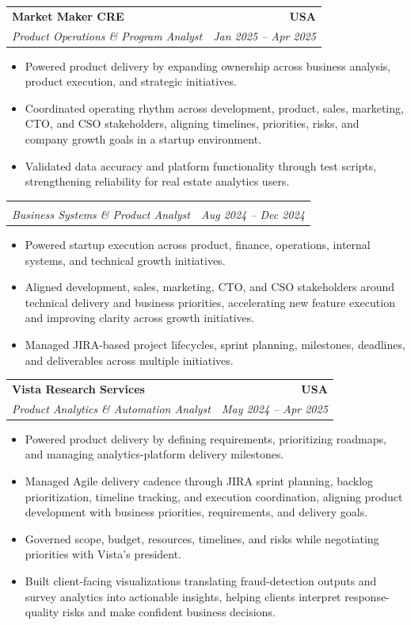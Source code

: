 \documentclass[letterpaper,10pt]{article}
\makeatletter
\newcommand{\resumeItem}[1]{\item \small{#1}}
\newcommand{\resumeSubheading}[4]{
  \vspace{1pt}\item
    \begin{tabular*}{1.0\textwidth}[t]{l@{\extracolsep{\fill}}r}
      \textbf{#1} & \textbf{\small #2} \\
      \textit{\small #3} & \textit{\small #4} \\
    \end{tabular*}\vspace{-6pt}
}
\newcommand{\resumeItemListStart}{\begin{itemize}[leftmargin=0.15in, itemsep=1pt, topsep=3pt]}
\newcommand{\resumeItemListEnd}{\end{itemize}\vspace{-2pt}}
\makeatother
\begin{document}
\vspace{-2pt}

\resumeSubheading
{Market Maker CRE}{USA}
{Product Operations \& Program Analyst}{Jan 2025 -- Apr 2025}
\resumeItemListStart
\resumeItem{Powered product delivery by expanding ownership across business analysis, product execution, and strategic initiatives.}
\resumeItem{Coordinated operating rhythm across development, product, sales, marketing, CTO, and CSO stakeholders, aligning timelines, priorities, risks, and company growth goals in a startup environment.}
\resumeItem{Validated data accuracy and platform functionality through test scripts, strengthening reliability for real estate analytics users.}
\resumeItemListEnd

\vspace{-12pt}

\resumeSubheading
{}{}
{Business Systems \& Product Analyst}{Aug 2024 -- Dec 2024}
\resumeItemListStart
\resumeItem{Powered startup execution across product, finance, operations, internal systems, and technical growth initiatives.}
\resumeItem{Aligned development, sales, marketing, CTO, and CSO stakeholders around technical delivery and business priorities, accelerating new feature execution and improving clarity across growth initiatives.}
\resumeItem{Managed JIRA-based project lifecycles, sprint planning, milestones, deadlines, and deliverables across multiple initiatives.}
\resumeItemListEnd

\vspace{-2pt}

\resumeSubheading
{Vista Research Services}{USA}
{Product Analytics \& Automation Analyst}{May 2024 -- Apr 2025}
\resumeItemListStart
\resumeItem{Powered product delivery by defining requirements, prioritizing roadmaps, and managing analytics-platform delivery milestones.}
\resumeItem{Managed Agile delivery cadence through JIRA sprint planning, backlog prioritization, timeline tracking, and execution coordination, aligning product development with business priorities, requirements, and delivery goals.}
\resumeItem{Governed scope, budget, resources, timelines, and risks while negotiating priorities with Vista's president.}
\resumeItem{Built client-facing visualizations translating fraud-detection outputs and survey analytics into actionable insights, helping clients interpret response-quality risks and make confident business decisions.}
\resumeItemListEnd

\vspace{-2pt}
\end{document}
